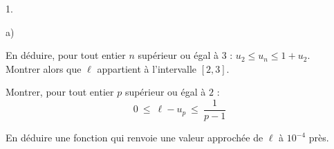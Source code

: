 \documentclass[11pt]{article}%
\begin{document}
\begin{noliste}{1.}
\begin{noliste}{a)}
  \item En déduire, pour tout entier $n$ supérieur ou égal à $3$ :
    $u_2 \leq u_n \leq 1 + u_2$.\\
    Montrer alors que $\ell$ appartient à l'intervalle $[2,3]$.
    
  \item Montrer, pour tout entier $p$ supérieur ou égal à $2$ :
    \[
      0 \ \leq \ \ell - u_p \ \leq \ \dfrac{1}{p-1}
    \]
    
  \item En déduire une fonction \Scilab{} qui renvoie une valeur
    approchée de $\ell$ à $10^{-4}$ près.
  \end{noliste}
\end{noliste}
\end{document}
